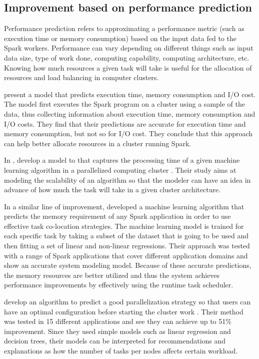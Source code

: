 \documentclass{article}
\begin{document}
\subsection{Improvement based on performance prediction}

Performance prediction refers to approximating a performance metric (such as execution time or memory consumption) based on the input data fed to the Spark workers. Performance can vary depending on different things such as input data size, type of work done, computing capability, computing architecture, etc. Knowing how much resources a given task will take is useful for the allocation of resources and load balancing in computer clusters.

\citeauthor{wang2015performance} \cite{wang2015performance} present a model that predicts execution time, memory consumption and I/O cost. The model first executes the Spark program on a cluster using a sample of the data, thus collecting information about execution time, memory consumption and I/O costs. They find that their predictions are accurate for execution time and memory consumption, but not so for I/O cost. They conclude that this approach can help better allocate resources in a cluster running Spark.

In \citeyear{Ulanov2017}, \citeauthor{Ulanov2017} develop a model to that captures the processing time of a given machine learning algorithm in a parallelized computing cluster \cite{Ulanov2017}. Their study aims at modeling the scalability of an algorithm so that the modeler can have an idea in advance of how much the task will take in a given cluster architecture.

In a similar line of improvement, \citeauthor{Marco2017} \cite{Marco2017} developed a machine learning algorithm that predicts the memory requirement of any Spark application in order to use effective task co-location strategies. The machine learning model is trained for each specific task by taking a subset of the dataset that is going to be used and then fitting a set of linear and non-linear regressions. Their approach was tested with a range of Spark applications that cover different application domains and show an accurate system modeling model. Because of these accurate predictions, the memory resources are better utilized and thus the system achieves performance improvements by effectively using the runtime task scheduler.

\citeauthor{BrandonHernandez2017} develop an algorithm to predict a good parallelization strategy so that users can have an optimal configuration before starting the cluster work \cite{BrandonHernandez2017}. Their method was tested in 15 different applications and see they can achieve up to 51\% improvement. Since they used simple models such as linear regression and decision trees, their models can be interpreted for recommendations and explanations as how the number of tasks per nodes affects certain workload.
\end{document}
